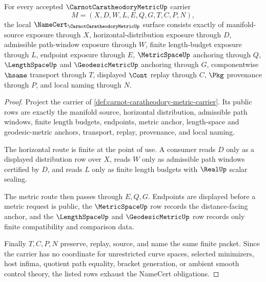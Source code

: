 \begin{theorem}
\label{thm:carnot-caratheodory-metric-namecert-obligations}
For every accepted $\CarnotCaratheodoryMetricUp$ carrier
$$
M=(X,D,W,L,E,Q,G,T,C,P,N),
$$
the local $\NameCert_{\CarnotCaratheodoryMetricUp}$ surface consists exactly of manifold-source exposure through $X$, horizontal-distribution exposure through $D$, admissible path-window exposure through $W$, finite length-budget exposure through $L$, endpoint exposure through $E$, $\MetricSpaceUp$ anchoring through $Q$, $\LengthSpaceUp$ and $\GeodesicMetricUp$ anchoring through $G$, componentwise $\hsame$ transport through $T$, displayed $\Cont$ replay through $C$, $\Pkg$ provenance through $P$, and local naming through $N$.
\end{theorem}
\begin{proof}
Project the carrier of \autoref{def:carnot-caratheodory-metric-carrier}. Its public rows are exactly the manifold source, horizontal distribution, admissible path windows, finite length budgets, endpoints, metric anchor, length-space and geodesic-metric anchors, transport, replay, provenance, and local naming.

The horizontal route is finite at the point of use. A consumer reads $D$ only as a displayed distribution row over $X$, reads $W$ only as admissible path windows certified by $D$, and reads $L$ only as finite length budgets with $\RealUp$ scalar sealing.

The metric route then passes through $E,Q,G$. Endpoints are displayed before a metric request is public, the $\MetricSpaceUp$ row records the distance-facing anchor, and the $\LengthSpaceUp$ and $\GeodesicMetricUp$ row records only finite compatibility and comparison data.

Finally $T,C,P,N$ preserve, replay, source, and name the same finite packet. Since the carrier has no coordinate for unrestricted curve spaces, selected minimizers, host infima, quotient path equality, bracket generation, or ambient smooth control theory, the listed rows exhaust the NameCert obligations.
\end{proof}

